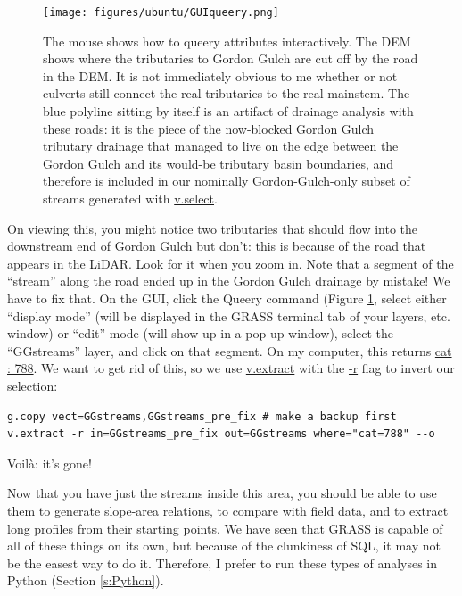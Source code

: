 \documentclass{book}
\begin{document}
\begin{figure}[h]
 \begin{center}
 \texttt{[image: figures/ubuntu/GUIqueery.png]}
 \caption{The mouse shows how to queery attributes interactively. The DEM shows where the tributaries to Gordon Gulch are cut off by the road in the DEM. It is not immediately obvious to me whether or not culverts still connect the real tributaries to the real mainstem. The blue polyline sitting by itself is an artifact of drainage analysis with these roads: it is the piece of the now-blocked Gordon Gulch tributary drainage that managed to live on the edge between the Gordon Gulch and its would-be tributary basin boundaries, and therefore is included in our nominally Gordon-Gulch-only subset of streams generated with \protect\url{v.select}.}
 \label{fig:GUIqueery}
 \end{center}
\end{figure}

On viewing this, you might notice two tributaries that should flow into the downstream end of Gordon Gulch but don't: this is because of the road that appears in the LiDAR. Look for it when you zoom in. Note that a segment of the ``stream'' along the road ended up in the Gordon Gulch drainage by mistake! We have to fix that. On the GUI, click the Queery command (Figure \ref{fig:GUIqueery}, select either ``display mode'' (will be displayed in the GRASS terminal tab of your layers, etc. window) or ``edit'' mode (will show up in a pop-up window), select the ``GGstreams'' layer, and click on that segment. On my computer, this returns \url{cat : 788}. We want to get rid of this, so we use \url{v.extract} with the \url{-r} flag to invert our selection:

\begin{lstlisting}
g.copy vect=GGstreams,GGstreams_pre_fix # make a backup first
v.extract -r in=GGstreams_pre_fix out=GGstreams where="cat=788" --o
\end{lstlisting}

Voil\`{a}: it's gone!

Now that you have just the streams inside this area, you should be able to use them to generate slope-area relations, to compare with field data, and to extract long profiles from their starting points. We have seen that GRASS is capable of all of these things on its own, but because of the clunkiness of SQL, it may not be the easest way to do it. Therefore, I prefer to run these types of analyses in Python (Section \ref{s:Python}).
\end{document}
